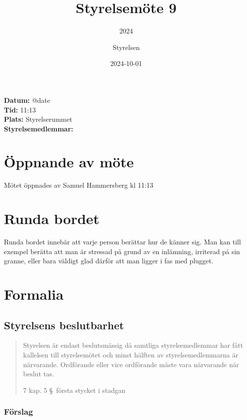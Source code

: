 \documentclass[protokoll]{dvd}
\begin{document}
\title{Styrelsemöte 9}
\subtitle{2024}
\author{Styrelsen}
\date{2024-10-01}


\textbf{Datum:} \csname @date\endcsname\\
\textbf{Tid:} 11:13\\
\textbf{Plats:} Styrelserummet\\
\textbf{Styrelsemedlemmar:}
\begin{närvarande_förtroendevalda}
\end{närvarande_förtroendevalda}

\section{Öppnande av möte}

Mötet öppnades av Samuel Hammersberg kl 11:13

\section{Runda bordet}

Runda bordet innebär att varje person berättar hur de känner sig.
Man kan till exempel berätta att man är stressad på grund av en inlämning, irriterad på sin granne, eller bara väldigt glad därför att man ligger i fas med plugget.

\section{Formalia}

\subsection{Styrelsens beslutbarhet}

\blockquote[7 kap. 5 \S~första stycket i stadgan][]{%
    Styrelsen är endast beslutsmässig då samtliga styrelsemedlemmar har fått kallelsen till styrelsemötet och minst hälften av styrelsemedlemmarna är närvarande.
    Ordförande eller vice ordförande måste vara närvarande när beslut tas.
}

\subsubsection*{Förslag}
\end{document}
